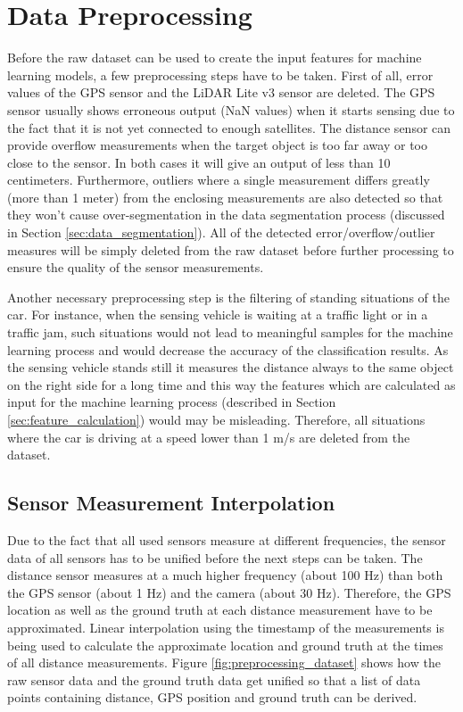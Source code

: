 \section{Data Preprocessing}
\label{sec:data_preprocessing}

Before the raw dataset can be used to create the input features for machine learning models, a few preprocessing steps have to be taken. First of all, error values of the GPS sensor and the LiDAR Lite v3 sensor are deleted. The GPS sensor usually shows erroneous output (NaN values) when it starts sensing due to the fact that it is not yet connected to enough satellites. The distance sensor can provide overflow measurements when the target object is too far away or too close to the sensor. In both cases it will give an output of less than 10 centimeters. Furthermore, outliers where a single measurement differs greatly (more than 1 meter) from the enclosing measurements are also detected so that they won't cause over-segmentation in the data segmentation process (discussed in Section \ref{sec:data_segmentation}). All of the detected error/overflow/outlier measures will be simply deleted from the raw dataset before further processing to ensure the quality of the sensor measurements.

Another necessary preprocessing step is the filtering of standing situations of the car. For instance, when the sensing vehicle is waiting at a traffic light or in a traffic jam, such situations would not lead to meaningful samples for the machine learning process and would decrease the accuracy of the classification results. As the sensing vehicle stands still it measures the distance always to the same object on the right side for a long time and this way the features which are calculated as input for the machine learning process (described in Section \ref{sec:feature_calculation}) would may be misleading. Therefore, all situations where the car is driving at a speed lower than 1 m/s are deleted from the dataset.


\subsection{Sensor Measurement Interpolation}
\label{sec:sensor_measurement_interpolation}

Due to the fact that all used sensors measure at different frequencies, the sensor data of all sensors has to be unified before the next steps can be taken. The distance sensor measures at a much higher frequency (about 100 Hz) than both the GPS sensor (about 1 Hz) and the camera (about 30 Hz). Therefore, the GPS location as well as the ground truth at each distance measurement have to be approximated. Linear interpolation using the timestamp of the measurements is being used to calculate the approximate location and ground truth at the times of all distance measurements. Figure \ref{fig:preprocessing_dataset} shows how the raw sensor data and the ground truth data get unified so that a list of data points containing distance, GPS position and ground truth can be derived.

